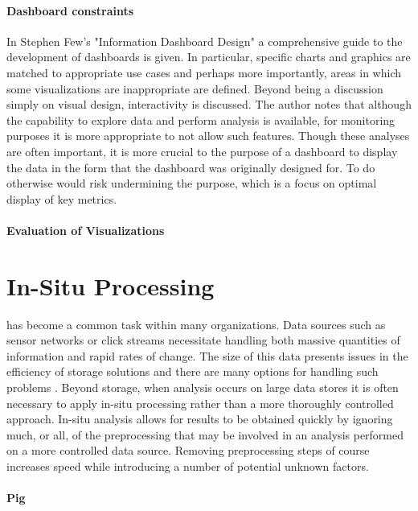 \paragraph{Dashboard constraints}
In Stephen Few's "Information Dashboard Design" \cite{Few2006} a comprehensive guide to the development of dashboards is given. In particular, specific charts and graphics are matched to appropriate use cases and perhaps more importantly, areas in which some visualizations are inappropriate are defined. Beyond being a discussion simply on visual design, interactivity is discussed. The author notes that although the capability to explore data and perform analysis is available, for monitoring purposes it is more appropriate to not allow such features. Though these analyses are often important, it is more crucial to the purpose of a dashboard to display the data in the form that the dashboard was originally designed for. To do otherwise would risk undermining the purpose, which is a focus on optimal display of key metrics.

\paragraph{Evaluation of Visualizations}


\section{In-Situ Processing}
\label{sec:insitu}

 has become a common task within many organizations. Data sources such as sensor networks or click streams necessitate handling both massive quantities of information and rapid rates of change. The size of this data presents issues in the efficiency of storage solutions and there are many options for handling such problems \cite{Klasky2011}. Beyond storage, when analysis occurs on large data stores it is often necessary to apply in-situ processing rather than a more thoroughly controlled approach. In-situ analysis allows for results to be obtained quickly by ignoring much, or all, of the preprocessing that may be involved in an analysis performed on a more controlled data source. Removing preprocessing steps of course increases speed while introducing a number of potential unknown factors.

\paragraph{Pig}

